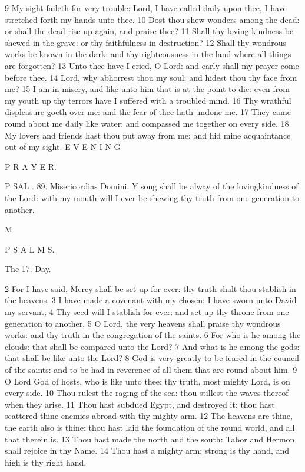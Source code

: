 9 My sight faileth for very trouble: Lord, I have called daily upon thee, I have stretched forth my hands unto thee. 10 Dost thou shew wonders among the dead: or shall the dead rise up again, and praise thee? 11 Shall thy loving-kindness be shewed in the grave: or thy faithfulness in destruction? 12 Shall thy wondrous works be known in the dark: and thy righteousness in the land where all things are forgotten? 13 Unto thee have I cried, O Lord: and early shall my prayer come before thee. 14 Lord, why abhorrest thou my soul: and hidest thou thy face from me? 15 I am in misery, and like unto him that is at the point to die: even from my youth up thy terrors have I suffered with a troubled mind. 16 Thy wrathful displeasure goeth over me: and the fear of thee hath undone me. 17 They came round about me daily like water: and compassed me together on every side. 18 My lovers and friends hast thou put away from me: and hid mine acquaintance out of my sight. E V E N I N G

P R A Y E R.

P SAL . 89. Misericordias Domini. Y song shall be alway of the lovingkindness of the Lord: with my mouth will I ever be shewing thy truth from one generation to another.

M

P S A L M S.

The 17. Day.

2 For I have said, Mercy shall be set up for ever: thy truth shalt thou stablish in the heavens. 3 I have made a covenant with my chosen: I have sworn unto David my servant; 4 Thy seed will I stablish for ever: and set up thy throne from one generation to another. 5 O Lord, the very heavens shall praise thy wondrous works: and thy truth in the congregation of the saints. 6 For who is he among the clouds: that shall be compared unto the Lord? 7 And what is he among the gods: that shall be like unto the Lord? 8 God is very greatly to be feared in the council of the saints: and to be had in reverence of all them that are round about him. 9 O Lord God of hosts, who is like unto thee: thy truth, most mighty Lord, is on every side. 10 Thou rulest the raging of the sea: thou stillest the waves thereof when they arise. 11 Thou hast subdued Egypt, and destroyed it: thou hast scattered thine enemies abroad with thy mighty arm. 12 The heavens are thine, the earth also is thine: thou hast laid the foundation of the round world, and all that therein is. 13 Thou hast made the north and the south: Tabor and Hermon shall rejoice in thy Name. 14 Thou hast a mighty arm: strong is thy hand, and high is thy right hand.

